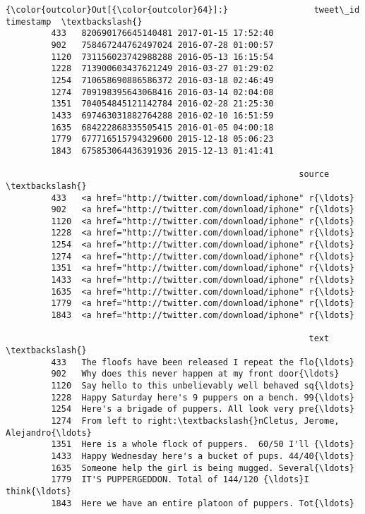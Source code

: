 \documentclass[11pt]{article}
\begin{document}
\begin{Verbatim}[commandchars=\\\{\}]
{\color{outcolor}Out[{\color{outcolor}64}]:}                 tweet\_id           timestamp  \textbackslash{}
         433   820690176645140481 2017-01-15 17:52:40   
         902   758467244762497024 2016-07-28 01:00:57   
         1120  731156023742988288 2016-05-13 16:15:54   
         1228  713900603437621249 2016-03-27 01:29:02   
         1254  710658690886586372 2016-03-18 02:46:49   
         1274  709198395643068416 2016-03-14 02:04:08   
         1351  704054845121142784 2016-02-28 21:25:30   
         1433  697463031882764288 2016-02-10 16:51:59   
         1635  684222868335505415 2016-01-05 04:00:18   
         1779  677716515794329600 2015-12-18 05:06:23   
         1843  675853064436391936 2015-12-13 01:41:41   
         
                                                          source  \textbackslash{}
         433   <a href="http://twitter.com/download/iphone" r{\ldots}   
         902   <a href="http://twitter.com/download/iphone" r{\ldots}   
         1120  <a href="http://twitter.com/download/iphone" r{\ldots}   
         1228  <a href="http://twitter.com/download/iphone" r{\ldots}   
         1254  <a href="http://twitter.com/download/iphone" r{\ldots}   
         1274  <a href="http://twitter.com/download/iphone" r{\ldots}   
         1351  <a href="http://twitter.com/download/iphone" r{\ldots}   
         1433  <a href="http://twitter.com/download/iphone" r{\ldots}   
         1635  <a href="http://twitter.com/download/iphone" r{\ldots}   
         1779  <a href="http://twitter.com/download/iphone" r{\ldots}   
         1843  <a href="http://twitter.com/download/iphone" r{\ldots}   
         
                                                            text  \textbackslash{}
         433   The floofs have been released I repeat the flo{\ldots}   
         902   Why does this never happen at my front door{\ldots}   
         1120  Say hello to this unbelievably well behaved sq{\ldots}   
         1228  Happy Saturday here's 9 puppers on a bench. 99{\ldots}   
         1254  Here's a brigade of puppers. All look very pre{\ldots}   
         1274  From left to right:\textbackslash{}nCletus, Jerome, Alejandro{\ldots}   
         1351  Here is a whole flock of puppers.  60/50 I'll {\ldots}   
         1433  Happy Wednesday here's a bucket of pups. 44/40{\ldots}   
         1635  Someone help the girl is being mugged. Several{\ldots}   
         1779  IT'S PUPPERGEDDON. Total of 144/120 {\ldots}I think{\ldots}   
         1843  Here we have an entire platoon of puppers. Tot{\ldots}   
         

\end{Verbatim}
\end{document}
